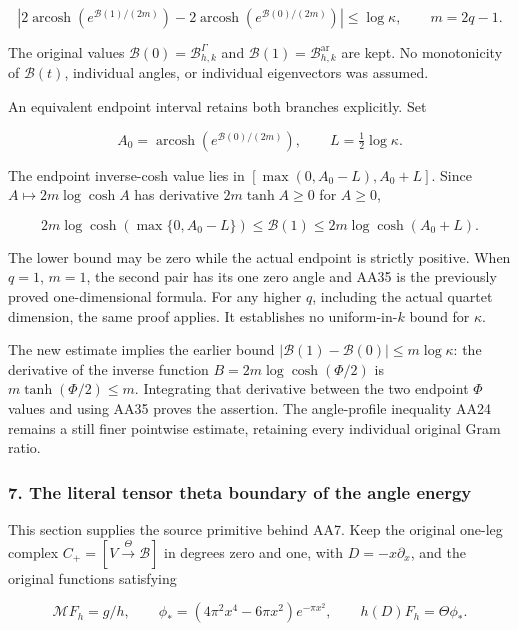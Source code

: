 \[
\boxed{
\left|2\operatorname{arcosh}(e^{\mathcal B(1)/(2m)})
      -2\operatorname{arcosh}(e^{\mathcal B(0)/(2m)})\right|
\le\log\kappa,
\qquad m=2q-1.
}
\tag{AA35}
\]

The original values \(\mathcal B(0)=\mathcal B^{\Gamma}_{h,k}\) and \(\mathcal B(1)=\mathcal B^{\mathrm{ar}}_{h,k}\) are kept. No monotonicity of \(\mathcal B(t)\), individual angles, or individual eigenvectors was assumed.

An equivalent endpoint interval retains both branches explicitly. Set

\[
A_0=\operatorname{arcosh}(e^{\mathcal B(0)/(2m)}),\qquad
L=\tfrac12\log\kappa.
\tag{AA36}
\]

The endpoint inverse-cosh value lies in \([\max(0,A_0-L),A_0+L]\). Since \(A\mapsto2m\log\cosh A\) has derivative \(2m\tanh A\ge0\) for \(A\ge0\),

\[
\boxed{
2m\log\cosh(\max\{0,A_0-L\})
\le\mathcal B(1)\le2m\log\cosh(A_0+L).
}
\tag{AA37}
\]

The lower bound may be zero while the actual endpoint is strictly positive. When \(q=1\), \(m=1\), the second pair has its one zero angle and AA35 is the previously proved one-dimensional formula. For any higher \(q\), including the actual quartet dimension, the same proof applies. It establishes no uniform-in-\(k\) bound for \(\kappa\).

The new estimate implies the earlier bound \(|\mathcal B(1)-\mathcal B(0)|\le m\log\kappa\): the derivative of the inverse function \(B=2m\log\cosh(\Phi/2)\) is \(m\tanh(\Phi/2)\le m\). Integrating that derivative between the two endpoint \(\Phi\) values and using AA35 proves the assertion. The angle-profile inequality AA24 remains a still finer pointwise estimate, retaining every individual original Gram ratio.

\subsubsection{7. The literal tensor theta boundary of the angle energy}\label{endpoint-all_degree_angle_review--the-literal-tensor-theta-boundary-of-the-angle-energy}

This section supplies the source primitive behind AA7. Keep the original one-leg complex \(C_+=[V\xrightarrow{\Theta}\mathscr B]\) in degrees zero and one, with \(D=-x\partial_x\), and the original functions satisfying

\[
\mathcal MF_h=g/h,\qquad
\phi_*=(4\pi^2x^4-6\pi x^2)e^{-\pi x^2},\qquad
h(D)F_h=\Theta\phi_*.
\tag{AA38}
\]

